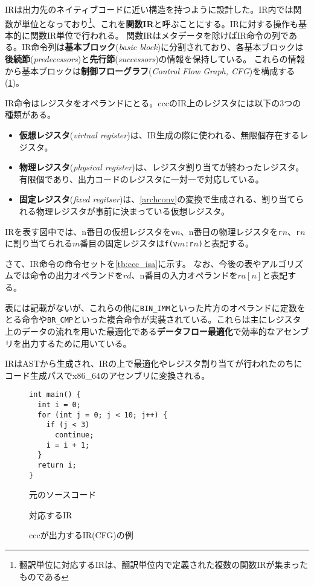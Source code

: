 \documentclass[../main.tex]{subfiles}
\begin{document}
IRは出力先のネイティブコードに近い構造を持つように設計した。IR内では関数が単位となっており\footnote{翻訳単位に対応するIRは、翻訳単位内で定義された複数の関数IRが集まったものである}、これを\textbf{関数IR}と呼ぶことにする。IRに対する操作も基本的に関数IR単位で行われる。
関数IRはメタデータを除けばIR命令の列である。IR命令列は\textbf{基本ブロック}(\textit{basic block})に分割されており、各基本ブロックは\textbf{後続節}(\textit{predecessors})と\textbf{先行節}(\textit{successors})の情報を保持している。
これらの情報から基本ブロックは\textbf{制御フローグラフ}(\textit{Control Flow Graph, CFG})を構成する(\cref{ccc_cfg_fig})。

IR命令はレジスタをオペランドにとる。cccのIR上のレジスタには以下の3つの種類がある。
\begin{itemize}
  \item \textbf{仮想レジスタ}(\textit{virtual register})は、IR生成の際に使われる、無限個存在するレジスタ。
  \item \textbf{物理レジスタ}(\textit{physical register})は、レジスタ割り当てが終わったレジスタ。有限個であり、出力コードのレジスタに一対一で対応している。
  \item \textbf{固定レジスタ}(\textit{fixed regitser})は、\cref{archconv}の変換で生成される、割り当てられる物理レジスタが事前に決まっている仮想レジスタ。
\end{itemize}

IRを表す図中では、n番目の仮想レジスタを\texttt{v}$n$、n番目の物理レジスタを\texttt{r}$n$、\texttt{r}$n$に割り当てられる$m$番目の固定レジスタは\texttt{f(v$m$:r$n$)}と表記する。

さて、IR命令の命令セットを\cref{tb:ccc_isa}に示す。
なお、今後の表やアルゴリズムでは命令の出力オペランドを$rd$、n番目の入力オペランドを$ra[n]$と表記する。

表には記載がないが、これらの他に\texttt{BIN\_IMM}といった片方のオペランドに定数をとる命令や\texttt{BR\_CMP}といった複合命令が実装されている。これらは主にレジスタ上のデータの流れを用いた最適化である\textbf{データフロー最適化}で効率的なアセンブリを出力するために用いている。

IRはASTから生成され、IRの上で最適化やレジスタ割り当てが行われたのちにコード生成パスでx86\_64のアセンブリに変換される。

\begin{figure}[hb]
  \begin{minipage}{0.50\hsize}
    \centering
    \begin{verbatim}
int main() {
  int i = 0;
  for (int j = 0; j < 10; j++) {
    if (j < 3)
      continue;
    i = i + 1;
  }
  return i;
}
    \end{verbatim}
    \caption*{元のソースコード}
  \end{minipage}
  \begin{minipage}{0.50\hsize}
    \centering
    
    \caption*{対応するIR}
  \end{minipage}
  \caption{cccが出力するIR(CFG)の例}
  \label{ccc_cfg_fig}
\end{figure}
\end{document}
